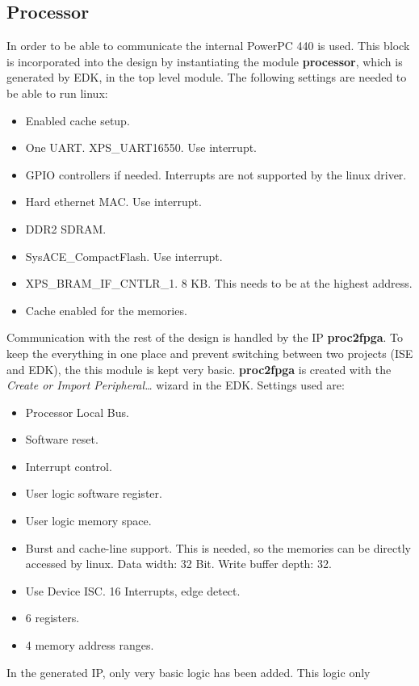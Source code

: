 \documentclass[11pt,technote,a4paper,onecolumn,dvips]{IEEEtran}
\newcommand{\module}[1]{{\ttfamily\bfseries #1}}
\begin{document}
\subsection{Processor}
In order to be able to communicate the internal PowerPC 440 \cite{ppc} is used.
This block is incorporated into the design by instantiating the module
\module{processor}, which is generated by EDK, in the top level module.
The following settings are needed to be able to run linux:
\begin{itemize}
    \item Enabled cache setup.
    \item One UART. XPS\_UART16550. Use interrupt.
    \item GPIO controllers if needed. Interrupts are not supported by the
        linux driver.
    \item Hard ethernet MAC. Use interrupt.
    \item DDR2 SDRAM.
    \item SysACE\_CompactFlash. Use interrupt.
    \item XPS\_BRAM\_IF\_CNTLR\_1. 8 KB. This needs to be at the highest
        address.
    \item Cache enabled for the memories.
\end{itemize}
Communication with the rest of the design is handled by the IP
\module{proc2fpga}. To
keep the everything in one place and prevent switching between two projects
(ISE and EDK), the this module is kept very basic.
\module{proc2fpga} is created with the \emph{Create or Import Peripheral\ldots}
wizard in the EDK. Settings used are:
\begin{itemize}
    \item Processor Local Bus.
    \item Software reset.
    \item Interrupt control.
    \item User logic software register.
    \item User logic memory space.
    \item Burst and cache-line support. This is needed, so the memories can
        be directly accessed by linux. Data width: 32 Bit. Write buffer depth:
        32.
    \item Use Device ISC. 16 Interrupts, edge detect.
    \item 6 registers.
    \item 4 memory address ranges.
\end{itemize}
In the generated IP, only very basic logic has been added. This logic only
\end{document}
